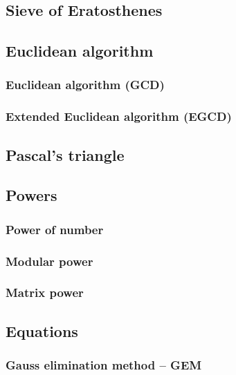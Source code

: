 \documentclass[a4paper]{article}
\begin{document}
\begin{multicols*}{2}
    \subsection{Sieve of Eratosthenes}
        
    \subsection{Euclidean algorithm}
        \subsubsection{Euclidean algorithm (GCD)}
            
        \subsubsection{Extended Euclidean algorithm (EGCD)}
            
    \subsection{Pascal's triangle}
        
    \subsection{Powers}
        \subsubsection{Power of number}
            
        \subsubsection{Modular power}
            
        \subsubsection{Matrix power}
            
    \subsection{Equations}
        \subsubsection{Gauss elimination method -- GEM}
            

\end{multicols*}
\end{document}
